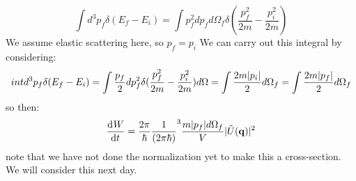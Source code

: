 \begin{equation}
    \int d^3p_f \delta(E_f - E_i) = \int p_f^2 dp_f d\Omega_f\delta(\frac{p_f^2}{2m} - \frac{p_i^2}{2m})
\end{equation}
We assume elastic scattering here, so $p_f = p_i$ We can carry out this integral by considering:
\begin{equation}
    int d^3p_f \delta(E_f - E_i) = \int \frac{p_f}{2}dp_f^2 \delta(\frac{p_f^2}{2m} - \frac{p_i^2}{2m})d\Omega = \int \frac{2m\lvert p_i \rvert}{2}d\Omega_f = \int \frac{2m\lvert p_f \rvert}{2}d\Omega_f
\end{equation}
so then:
\begin{equation}
    \dod{W}{t} = \frac{2\pi}{\hbar}\frac{1}{(2\pi\hbar)}^3\frac{m\abs{p_f}d\Omega_f}{V}\abs{\tilde{U}(\v{q})}^2
\end{equation}
note that we have not done the normalization yet to make this a cross-section. We will consider this next day.